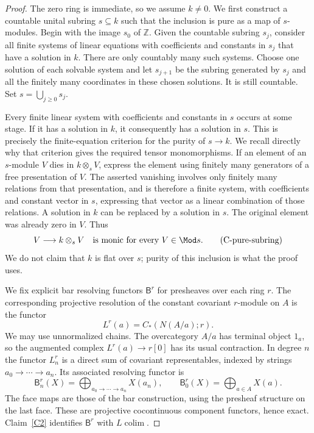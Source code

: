 \begin{proof}
The zero ring is immediate, so we assume $k\ne0$. We first construct a countable unital subring $s\subseteq k$ such that the inclusion is pure as a map of $s$-modules. Begin with the image $s_0$ of $\mathbb Z$. Given the countable subring $s_j$, consider all finite systems of linear equations with coefficients and constants in $s_j$ that have a solution in $k$. There are only countably many such systems. Choose one solution of each solvable system and let $s_{j+1}$ be the subring generated by $s_j$ and all the finitely many coordinates in these chosen solutions. It is still countable. Set $s=\bigcup_{j\geq0}s_j$.

Every finite linear system with coefficients and constants in $s$ occurs at some stage. If it has a solution in $k$, it consequently has a solution in $s$. This is precisely the finite-equation criterion for the purity of $s\to k$. We recall directly why that criterion gives the required tensor monomorphisms. If an element of an $s$-module $V$ dies in $k\otimes_sV$, express the element using finitely many generators of a free presentation of $V$. The asserted vanishing involves only finitely many relations from that presentation, and is therefore a finite system, with coefficients and constant vector in $s$, expressing that vector as a linear combination of those relations. A solution in $k$ can be replaced by a solution in $s$. The original element was already zero in $V$. Thus
\[
 V\longrightarrow k\otimes_sV
 \quad\text{is monic for every }V\in\Mod s.
 \tag{C-pure-subring}\label{Cpuresubring}
\]
We do not claim that $k$ is flat over $s$; purity of this inclusion is what the proof uses.

We fix explicit bar resolving functors $\mathsf B^r$ for presheaves over each ring $r$. The corresponding projective resolution of the constant covariant $r$-module on $A$ is the functor
\[
 L^r(a)=C_*(N(A/a);r).
\]
We may use unnormalized chains. The overcategory $A/a$ has terminal object $1_a$, so the augmented complex $L^r(a)\to r[0]$ has its usual contraction. In degree $n$ the functor $L^r_n$ is a direct sum of covariant representables, indexed by strings $a_0\to\cdots\to a_n$. Its associated resolving functor is
\[
 \mathsf B^r_n(X)=
 \bigoplus_{a_0\to\cdots\to a_n}X(a_n),
 \qquad
 \mathsf B^r_0(X)=\bigoplus_{a\in A}X(a).
 \tag{C-bar-formula}\label{Cbarformula}
\]
The face maps are those of the bar construction, using the presheaf structure on the last face. These are projective cocontinuous component functors, hence exact. Claim~\ref{C2} identifies $\mathsf B^r$ with $L\operatorname{colim}$.


\end{proof}
